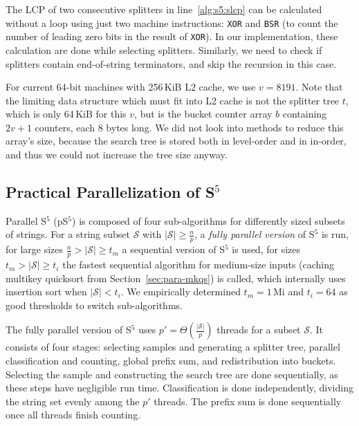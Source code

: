 \documentclass[a4paper]{myjournal}
\newcommand{\Strings}{\mathcal{S}}
\begin{document}
The LCP of two consecutive splitters in line~\ref{alg:s5:slcp} can be calculated
without a loop using just two machine instructions: \texttt{XOR} and
\texttt{BSR} (to count the number of leading zero bits in the result of
\texttt{XOR}). In our implementation, these calculation are done while selecting
splitters. Similarly, we need to check if splitters contain end-of-string
terminators, and skip the recursion in this case.

For current 64-bit machines with 256\,KiB L2 cache, we use $v = 8191$. Note that
the limiting data structure which must fit into L2 cache is not the splitter
tree $t$, which is only 64\,KiB for this $v$, but is the bucket counter array
$b$ containing $2v+1$ counters, each 8 bytes long. We did not look into methods
to reduce this array's size, because the search tree is stored both in
level-order and in in-order, and thus we could not increase the tree size
anyway.

\subsection{Practical Parallelization of \texorpdfstring{S$^5$}{S5}}\label{sec:parallel-s5}

Parallel S$^5$ (pS$^5$) is composed of four sub-algorithms for differently sized
subsets of strings. For a string subset $\Strings$ with $|\Strings| \geq
\frac{n}{p}$, a \emph{fully parallel version} of S$^5$ is run, for large sizes
$\frac{n}{p} > |\Strings| \geq t_m$ a sequential version of S$^5$ is used, for
sizes $t_m > |\Strings| \geq t_i$ the fastest sequential algorithm for
medium-size inputs (caching multikey quicksort from Section~\ref{sec:para-mkqs})
is called, which internally uses insertion sort when $|\Strings| < t_i$.  We
empirically determined $t_m = 1\,\text{Mi}$ and $t_i = 64$ as good thresholds to
switch sub-algorithms.

The fully parallel version of S$^5$ uses $p' = \Theta( \frac{|\Strings|}{p} )$
threads for a subset $\Strings$. It consists of four stages: selecting samples
and generating a splitter tree, parallel classification and counting, global
prefix sum, and redistribution into buckets. Selecting the sample and
constructing the search tree are done sequentially, as these steps have
negligible run time. Classification is done independently, dividing the string
set evenly among the $p'$ threads. The prefix sum is done sequentially once all
threads finish counting.
\end{document}
